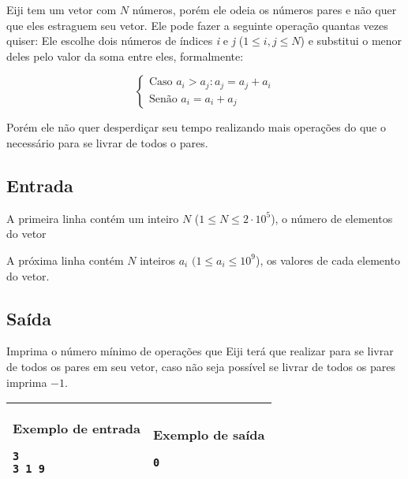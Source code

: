 Eiji tem um vetor com $N$ números, porém ele odeia os números pares e não quer que eles estraguem seu vetor. Ele pode fazer a seguinte operação quantas vezes quiser: Ele escolhe dois números de índices \textit{i} e \textit{j} ($1\leq i, j\leq N$) e substitui o menor deles pelo valor da soma entre eles, formalmente:

$$
\begin{cases}
    \text{Caso } a_i > a_j: a_j = a_j + a_i \\
    \text{Senão } a_i = a_i + a_j
\end{cases}
$$

Porém ele não quer desperdiçar seu tempo realizando mais operações do que o necessário para se livrar de todos o pares.

\subsection*{Entrada}

A primeira linha contém um inteiro $N$ ($1 \leq N \leq 2\cdot 10^5$), o número de elementos do vetor

A próxima linha contém $N$ inteiros $a_i$ $(1 \leq a_i \leq 10^9$), os valores de cada elemento do vetor.

\subsection*{Saída}

Imprima o número mínimo de operações que Eiji terá que realizar para se livrar de todos os pares em seu vetor, caso não seja possível se livrar de todos os pares imprima $-1$.

\begin{table}[!h]
\centering
\begin{tabular}{|l|l|}
\hline
\begin{minipage}[t]{3in}
\textbf{Exemplo de entrada}
\begin{verbatim}
3
3 1 9
\end{verbatim}
\vspace{1mm}
\end{minipage}
&
\begin{minipage}[t]{3in}
\textbf{Exemplo de saída}
\begin{verbatim}
0
\end{verbatim}
\vspace{1mm}
\end{minipage} \\
\hline
\end{tabular}
\end{table}

